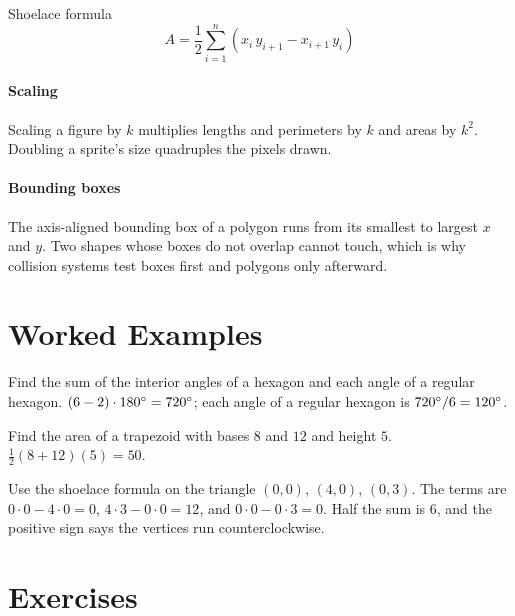 \begin{keybox}{Shoelace formula}
\[
A = \frac{1}{2}\sum_{i=1}^{n}\left(x_i\, y_{i+1} - x_{i+1}\, y_i\right)
\]
\end{keybox}

\paragraph{Scaling} Scaling a figure by $k$ multiplies lengths and perimeters by $k$ and areas by $k^2$. Doubling a sprite's size quadruples the pixels drawn.

\paragraph{Bounding boxes} The axis-aligned bounding box of a polygon runs from its smallest to largest $x$ and $y$. Two shapes whose boxes do not overlap cannot touch, which is why collision systems test boxes first and polygons only afterward.

\section{Worked Examples}

\begin{example}
Find the sum of the interior angles of a hexagon and each angle of a regular hexagon.
\solution $(6 - 2) \cdot 180^\circ = 720^\circ$; each angle of a regular hexagon is $720^\circ / 6 = 120^\circ$.
\end{example}

\begin{example}
Find the area of a trapezoid with bases $8$ and $12$ and height $5$.
\solution $\tfrac{1}{2}(8 + 12)(5) = 50$.
\end{example}

\begin{example}
Use the shoelace formula on the triangle $(0, 0)$, $(4, 0)$, $(0, 3)$.
\solution The terms are $0 \cdot 0 - 4 \cdot 0 = 0$, $4 \cdot 3 - 0 \cdot 0 = 12$, and $0 \cdot 0 - 0 \cdot 3 = 0$. Half the sum is $6$, and the positive sign says the vertices run counterclockwise.
\end{example}

\section{Exercises}

